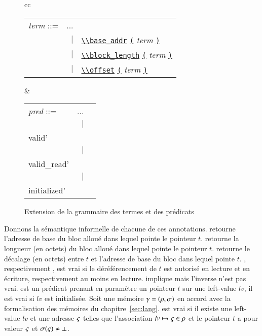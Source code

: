 \begin{figure}
  \centering
  \begin{tabular}{cc}
    \begin{tabular}{lrl}
      \textit{term} ::= & ... \\
      & $\mid$
      & \underline{\lstinline'\\base_addr'} \underline{\lstinline'('} \textit{term} \underline{\lstinline')'} \\
      & $\mid$
      & \underline{\lstinline'\\block_length'} \underline{\lstinline'('} \textit{term} \underline{\lstinline')'} \\
      & $\mid$
      & \underline{\lstinline'\\offset'} \underline{\lstinline'('} \textit{term} \underline{\lstinline')'} \\
    \end{tabular}
    &
    \begin{tabular}{lrl}
      \textit{pred} ::= & ... \\
      & $\mid$
      & \underline{\lstinline'\\valid'} \underline{\lstinline'('} \textit{term} \underline{\lstinline')'} \\
      & $\mid$
      & \underline{\lstinline'\\valid_read'} \underline{\lstinline'('} \textit{term} \underline{\lstinline')'} \\
      & $\mid$
      & \underline{\lstinline'\\initialized'} \underline{\lstinline'('} \textit{term} \underline{\lstinline')'} \\
    \end{tabular}
  \end{tabular}
  \caption{Extension de la grammaire des termes et des prédicats
    \label{fig:gram-ext}}
\end{figure}


Donnons la sémantique informelle de chacune de ces annotations.
\baseaddrt retourne l'adresse de base du bloc alloué dans lequel pointe le
pointeur $t$.
\blocklengtht retourne la longueur (en octets) du bloc alloué dans lequel
pointe le pointeur $t$.
\offsett retourne le décalage (en octets) entre $t$ et l'adresse de
base du bloc dans lequel pointe $t$.
\validt, respectivement \validreadt, est vrai si le déréférencement de
$t$ est autorisé en lecture et en écriture, respectivement au moins en
lecture.
\validt implique \validreadt mais l'inverse n'est pas vrai.
\initializedt est un prédicat prenant en paramètre un pointeur $t$ sur une
left-value $lv$, il est vrai si $lv$ est initialisée.
Soit une mémoire $\gamma = (\rho, \sigma)$ en accord avec la formalisation des
mémoires du chapitre~\ref{sec:lang}.
\initializedt est vrai si il existe une left-value $lv$ et une adresse $\varsigma$
telles que l'association $lv \mapsto \varsigma \in \rho$ et le pointeur $t$ a pour
valeur $\varsigma$ et $\sigma(\varsigma) \neq \bot$.



